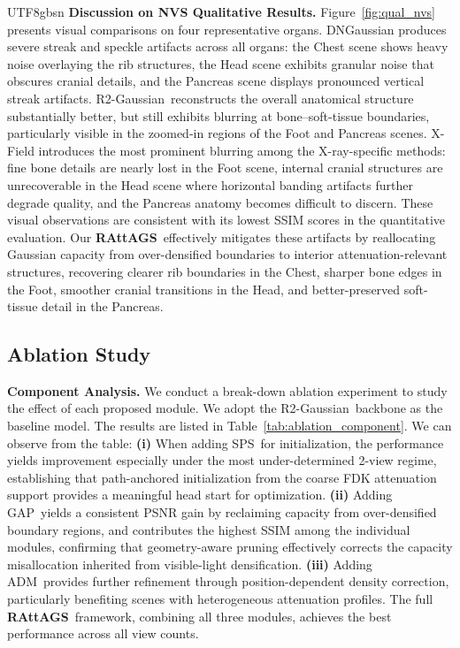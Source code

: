 \documentclass{egpubl}
\newcommand{\traceplain}{RAttAGS}
\newcommand{\RAttAGS}{\textbf{\traceplain}}
\newcommand{\sps}{SPS}
\newcommand{\gap}{GAP}
\newcommand{\adm}{ADM}
\newcommand{\rtwo}{R2-Gaussian}
\begin{document}
\begin{CJK*}{UTF8}{gbsn}
\textbf{Discussion on NVS Qualitative Results.} Figure~\ref{fig:qual_nvs} presents visual comparisons on four representative organs. DNGaussian produces severe streak and speckle artifacts across all organs: the Chest scene shows heavy noise overlaying the rib structures, the Head scene exhibits granular noise that obscures cranial details, and the Pancreas scene displays pronounced vertical streak artifacts. \rtwo\ reconstructs the overall anatomical structure substantially better, but still exhibits blurring at bone--soft-tissue boundaries, particularly visible in the zoomed-in regions of the Foot and Pancreas scenes. X-Field introduces the most prominent blurring among the X-ray-specific methods: fine bone details are nearly lost in the Foot scene, internal cranial structures are unrecoverable in the Head scene where horizontal banding artifacts further degrade quality, and the Pancreas anatomy becomes difficult to discern. These visual observations are consistent with its lowest SSIM scores in the quantitative evaluation. Our \RAttAGS\ effectively mitigates these artifacts by reallocating Gaussian capacity from over-densified boundaries to interior attenuation-relevant structures, recovering clearer rib boundaries in the Chest, sharper bone edges in the Foot, smoother cranial transitions in the Head, and better-preserved soft-tissue detail in the Pancreas.

\subsection{Ablation Study}
\label{sec:ablation}

\textbf{Component Analysis.} We conduct a break-down ablation experiment to study the effect of each proposed module. We adopt the \rtwo\ backbone as the baseline model. The results are listed in Table~\ref{tab:ablation_component}. We can observe from the table: \textbf{(i)} When adding \sps\ for initialization, the performance yields improvement especially under the most under-determined 2-view regime, establishing that path-anchored initialization from the coarse FDK attenuation support provides a meaningful head start for optimization. \textbf{(ii)} Adding \gap\ yields a consistent PSNR gain by reclaiming capacity from over-densified boundary regions, and contributes the highest SSIM among the individual modules, confirming that geometry-aware pruning effectively corrects the capacity misallocation inherited from visible-light densification. \textbf{(iii)} Adding \adm\ provides further refinement through position-dependent density correction, particularly benefiting scenes with heterogeneous attenuation profiles. The full \RAttAGS\ framework, combining all three modules, achieves the best performance across all view counts.


\end{CJK*}
\end{document}
